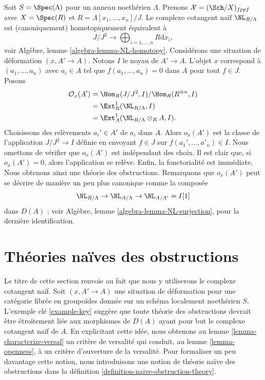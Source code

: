 \begin{example}
\label{example-key}
Soit $S = \Spec(\Lambda)$ pour un anneau noethérien $\Lambda$. Prenons
$\mathcal{X} = (\Sch/X)_{fppf}$ avec $X = \Spec(R)$ et
$R = \Lambda[x_1, \ldots, x_n]/J$. Le complexe cotangent naïf
$\NL_{R/\Lambda}$ est (canoniquement) homotopiquement équivalent à
$$
J/J^2
\longrightarrow
\bigoplus\nolimits_{i = 1, \ldots, n} R\text{d}x_i,
$$
voir Algèbre, lemme \ref{algebra-lemma-NL-homotopy}. Considérons une situation
de déformation $(x, A' \to A)$. Notons $I$ le noyau de $A' \to A$. L'objet
$x$ correspond à $(a_1, \ldots, a_n)$ avec $a_i \in A$ tel que
$f(a_1, \ldots, a_n) = 0$ dans $A$ pour tout $f \in J$. Posons
\begin{align*}
\mathcal{O}_x(A')
& =
\Hom_R(J/J^2, I)/\Hom_R(R^{\oplus n}, I) \\
& =
\Ext^1_R(\NL_{R/\Lambda}, I) \\
& =
\Ext^1_A(\NL_{R/\Lambda} \otimes_R A, I).
\end{align*}
Choisissons des relèvements $a_i' \in A'$ de $a_i$ dans $A$. Alors
$o_x(A')$ est la classe de l'application $J/J^2 \to I$ définie en envoyant
$f \in J$ sur $f(a_1', \ldots, a'_n) \in I$. Nous omettons de vérifier que
$o_x(A')$ est indépendant des choix. Il est clair que, si $o_x(A') = 0$,
alors l'application se relève. Enfin, la fonctorialité est immédiate. Nous
obtenons ainsi une théorie des obstructions. Remarquons que $o_x(A')$ peut se
décrire de manière un peu plus canonique comme la composée
$$
\NL_{R/\Lambda} \to \NL_{A/\Lambda} \to \NL_{A/A'} = I[1]
$$
dans $D(A)$ ; voir Algèbre, lemme \ref{algebra-lemma-NL-surjection}, pour la
dernière identification.
\end{example}









\section{Théories naïves des obstructions}
\label{section-naive-obstruction-theory}

\noindent
Le titre de cette section renvoie au fait que nous y utiliserons le complexe
cotangent naïf. Soit $(x, A' \to A)$ une situation de déformation pour une
catégorie fibrée en groupoïdes donnée sur un schéma localement noethérien $S$.
L'exemple clé \ref{example-key} suggère que toute théorie des obstructions
devrait être étroitement liée aux morphismes de $D(A)$ ayant pour but le
complexe cotangent naïf de $A$. En explicitant cette idée, nous obtenons au
lemme \ref{lemma-characterize-versal} un critère de versalité qui conduit, au
lemme \ref{lemma-openness}, à un critère d'ouverture de la versalité. Pour
formaliser un peu davantage cette notion, nous introduisons une notion de
théorie naïve des obstructions dans la définition
\ref{definition-naive-obstruction-theory}.

